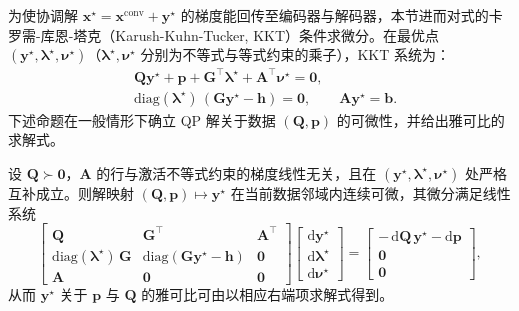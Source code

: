 为使协调解 $\mathbf{x}^{\star}=\mathbf{x}^{\mathrm{conv}}+\mathbf{y}^{\star}$ 的梯度能回传至编码器与解码器，本节进而对式的卡罗需-库恩-塔克（Karush-Kuhn-Tucker, KKT）条件求微分。在最优点 $(\mathbf{y}^{\star},\boldsymbol{\lambda}^{\star},\boldsymbol{\nu}^{\star})$（$\boldsymbol{\lambda}^{\star},\boldsymbol{\nu}^{\star}$ 分别为不等式与等式约束的乘子），KKT 系统为：
\begin{equation}
\begin{aligned}
&\mathbf{Q}\mathbf{y}^{\star}+\mathbf{p}+\mathbf{G}^{\top}\boldsymbol{\lambda}^{\star}+\mathbf{A}^{\top}\boldsymbol{\nu}^{\star}=\mathbf{0},\\
&\mathrm{diag}(\boldsymbol{\lambda}^{\star})\,(\mathbf{G}\mathbf{y}^{\star}-\mathbf{h})=\mathbf{0},\qquad \mathbf{A}\mathbf{y}^{\star}=\mathbf{b}.
\end{aligned}
\label{eq.cohact.kkt}
\end{equation}
下述命题在一般情形下确立 QP 解关于数据 $(\mathbf{Q},\mathbf{p})$ 的可微性，并给出雅可比的求解式。

\begin{Theorem}[QP 解的可微性]\label{prop.cohact.kktdiff}
设 $\mathbf{Q}\succ\mathbf{0}$，$\mathbf{A}$ 的行与激活不等式约束的梯度线性无关，且在 $(\mathbf{y}^{\star},\boldsymbol{\lambda}^{\star},\boldsymbol{\nu}^{\star})$ 处严格互补成立。则解映射 $(\mathbf{Q},\mathbf{p})\mapsto\mathbf{y}^{\star}$ 在当前数据邻域内连续可微，其微分满足线性系统
\begin{equation}
\begin{bmatrix}
\mathbf{Q} & \mathbf{G}^{\top} & \mathbf{A}^{\top}\\
\mathrm{diag}(\boldsymbol{\lambda}^{\star})\,\mathbf{G} & \mathrm{diag}(\mathbf{G}\mathbf{y}^{\star}-\mathbf{h}) & \mathbf{0}\\
\mathbf{A} & \mathbf{0} & \mathbf{0}
\end{bmatrix}
\begin{bmatrix}
\mathrm{d}\mathbf{y}^{\star}\\ \mathrm{d}\boldsymbol{\lambda}^{\star}\\ \mathrm{d}\boldsymbol{\nu}^{\star}
\end{bmatrix}
=
\begin{bmatrix}
-\,\mathrm{d}\mathbf{Q}\,\mathbf{y}^{\star}-\mathrm{d}\mathbf{p}\\ \mathbf{0}\\ \mathbf{0}
\end{bmatrix},
\label{eq.cohact.kktdiff}
\end{equation}
从而 $\mathbf{y}^{\star}$ 关于 $\mathbf{p}$ 与 $\mathbf{Q}$ 的雅可比可由以相应右端项求解式得到。
\end{Theorem}

